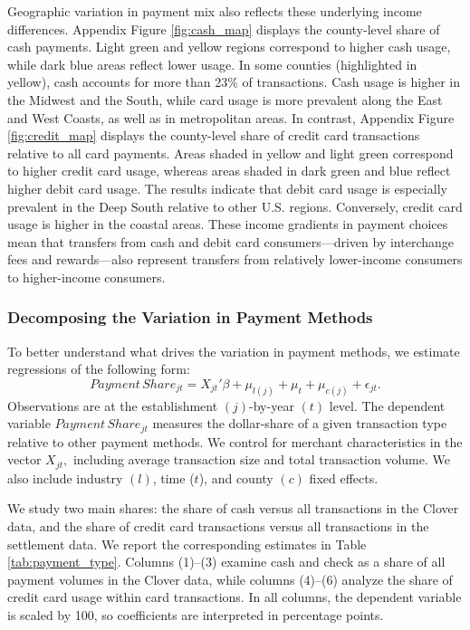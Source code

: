 \documentclass[main.tex]{subfiles}
\begin{document}
Geographic variation in payment mix also reflects these underlying income differences.
Appendix Figure \ref{fig:cash_map} displays the county-level share of cash payments.
Light green and yellow regions correspond to higher cash usage, while dark blue areas reflect lower usage.
In some counties (highlighted in yellow), cash accounts for more than 23\% of transactions.
Cash usage is higher in the Midwest and the South, while card usage is more prevalent along the East and West Coasts, as well as in metropolitan areas. In contrast, Appendix Figure \ref{fig:credit_map} displays the county-level share of credit card transactions relative to all card payments.
Areas shaded in yellow and light green correspond to higher credit card usage, whereas areas shaded in dark green and blue reflect higher debit card usage.
The results indicate that debit card usage is especially prevalent in the Deep South relative to other U.S. regions.
Conversely, credit card usage is higher in the coastal areas.
These income gradients in payment choices mean that transfers from cash and debit card consumers---driven by interchange fees and rewards---also represent transfers from relatively lower-income consumers to higher-income consumers.

\subsubsection{Decomposing the Variation in Payment Methods}
To better understand what drives the variation in payment methods, we estimate regressions of the following form:
\begin{equation}
Payment\,Share_{jt}=X_{jt}'\beta+\mu_{l(j)}+\mu_t+\mu_{c(j)}+\epsilon_{jt}.
\label{eq:payment_type}
\end{equation}
Observations are at the establishment $(j)$-by-year $(t)$ level.
The dependent variable $Payment\,Share_{jt}$ measures the dollar-share of a given transaction type relative to other payment methods.
We control for merchant characteristics in the vector $X_{jt},$ including average transaction size and total transaction volume.
We also include industry $(l)$, time ($t$), and county $(c)$ fixed effects.

We study two main shares: the share of cash versus all transactions in the Clover data, and the share of credit card transactions versus all transactions in the settlement data. 
We report the corresponding estimates in Table \ref{tab:payment_type}.
Columns (1)--(3) examine cash and check as a share of all payment volumes in the Clover data, while columns (4)--(6) analyze the share of credit card usage within card transactions.
In all columns, the dependent variable is scaled by 100, so coefficients are interpreted in percentage points.
\end{document}
